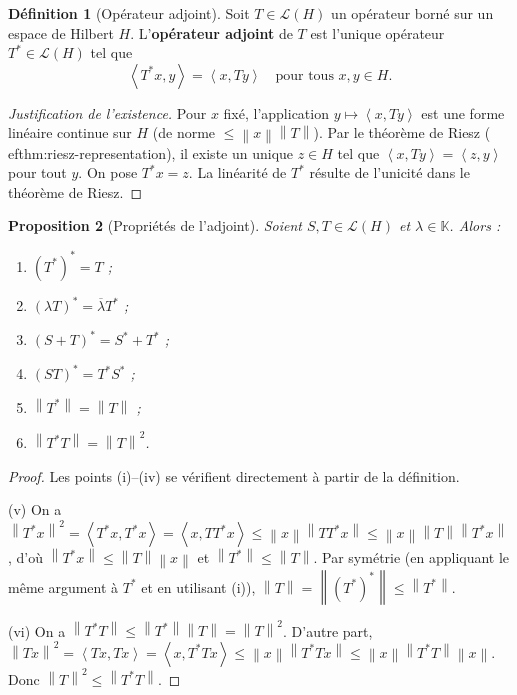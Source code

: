 \documentclass[a4paper,12pt]{book}
\newcommand{\K}{\mathbb{K}}
\newcommand{\norm}[1]{\left\| #1 \right\|}
\newcommand{\inner}[2]{\left\langle #1, #2 \right\rangle}
\theoremstyle{definition}
\newtheorem{definition}{Définition}[chapter]
\theoremstyle{plain}
\newtheorem{proposition}[definition]{Proposition}
\theoremstyle{remark}
\begin{document}
\begin{definition}[Opérateur adjoint]\label{def:adjoint}
Soit $T \in \mathcal{L}(H)$ un opérateur borné sur un espace de Hilbert $H$. L'\textbf{opérateur adjoint} de $T$ est l'unique opérateur $T^* \in \mathcal{L}(H)$ tel que
\[
    \inner{T^*x}{y} = \inner{x}{Ty} \quad \text{pour tous } x, y \in H.
\]
\end{definition}

\begin{proof}[Justification de l'existence]
Pour $x$ fixé, l'application $y \mapsto \inner{x}{Ty}$ est une forme linéaire continue sur $H$ (de norme $\leq \norm{x}\norm{T}$). Par le théorème de Riesz (
ef{thm:riesz-representation}), il existe un unique $z \in H$ tel que $\inner{x}{Ty} = \inner{z}{y}$ pour tout $y$. On pose $T^*x = z$. La linéarité de $T^*$ résulte de l'unicité dans le théorème de Riesz.
\end{proof}

\begin{proposition}[Propriétés de l'adjoint]\label{prop:proprietes-adjoint}
Soient $S, T \in \mathcal{L}(H)$ et $\lambda \in \K$. Alors :
\begin{enumerate}[label=(\roman*)]
    \item $(T^*)^* = T$ ;
    \item $(\lambda T)^* = \overline{\lambda} T^*$ ;
    \item $(S + T)^* = S^* + T^*$ ;
    \item $(ST)^* = T^*S^*$ ;
    \item $\norm{T^*} = \norm{T}$ ;
    \item $\norm{T^*T} = \norm{T}^2$.
\end{enumerate}
\end{proposition}

\begin{proof}
Les points (i)--(iv) se vérifient directement à partir de la définition.

(v) On a $\norm{T^*x}^2 = \inner{T^*x}{T^*x} = \inner{x}{TT^*x} \leq \norm{x}\norm{TT^*x} \leq \norm{x}\norm{T}\norm{T^*x}$, d'où $\norm{T^*x} \leq \norm{T}\norm{x}$ et $\norm{T^*} \leq \norm{T}$. Par symétrie (en appliquant le même argument à $T^*$ et en utilisant (i)), $\norm{T} = \norm{(T^*)^*} \leq \norm{T^*}$.

(vi) On a $\norm{T^*T} \leq \norm{T^*}\norm{T} = \norm{T}^2$. D'autre part, $\norm{Tx}^2 = \inner{Tx}{Tx} = \inner{x}{T^*Tx} \leq \norm{x}\norm{T^*Tx} \leq \norm{x}\norm{T^*T}\norm{x}$. Donc $\norm{T}^2 \leq \norm{T^*T}$.
\end{proof}
\end{document}
